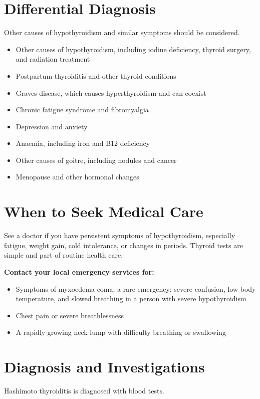 \section*{Differential Diagnosis}
Other causes of hypothyroidism and similar symptoms should be considered.

\begin{itemize}
    \item Other causes of hypothyroidism, including iodine deficiency, thyroid surgery, and radiation treatment
    \item Postpartum thyroiditis and other thyroid conditions
    \item Graves disease, which causes hyperthyroidism and can coexist
    \item Chronic fatigue syndrome and fibromyalgia
    \item Depression and anxiety
    \item Anaemia, including iron and B12 deficiency
    \item Other causes of goitre, including nodules and cancer
    \item Menopause and other hormonal changes
\end{itemize}

\section*{When to Seek Medical Care}
See a doctor if you have persistent symptoms of hypothyroidism, especially fatigue, weight gain, cold intolerance, or changes in periods. Thyroid tests are simple and part of routine health care.

\textbf{Contact your local emergency services for:}
\begin{itemize}
    \item Symptoms of myxoedema coma, a rare emergency: severe confusion, low body temperature, and slowed breathing in a person with severe hypothyroidism
    \item Chest pain or severe breathlessness
    \item A rapidly growing neck lump with difficulty breathing or swallowing
\end{itemize}

\section*{Diagnosis and Investigations}
Hashimoto thyroiditis is diagnosed with blood tests.

